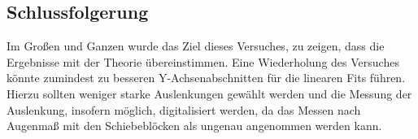 	\subsection{Schlussfolgerung}
	
		Im Großen und Ganzen wurde das Ziel dieses Versuches, zu zeigen, dass die Ergebnisse mit der Theorie übereinstimmen. Eine Wiederholung des Versuches könnte zumindest zu besseren Y-Achsenabschnitten für die linearen Fits führen. Hierzu sollten weniger starke Auslenkungen gewählt werden und die Messung der Auslenkung, insofern möglich, digitalisiert werden, da das Messen nach Augenmaß mit den Schiebeblöcken als ungenau angenommen werden kann.
